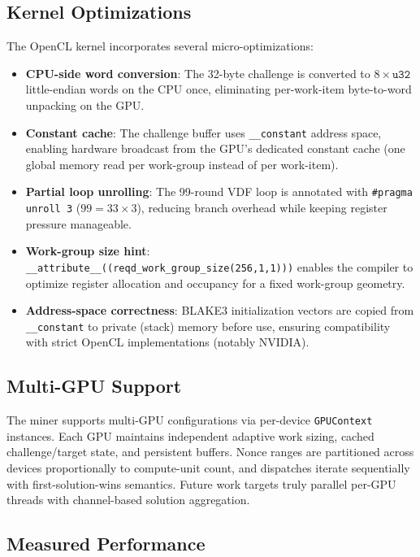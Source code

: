 \documentclass[11pt,a4paper]{article}
\begin{document}
\subsection{Kernel Optimizations}

The OpenCL kernel incorporates several micro-optimizations:

\begin{itemize}
    \item \textbf{CPU-side word conversion}: The 32-byte challenge is converted to $8 \times \mathtt{u32}$ little-endian words on the CPU once, eliminating per-work-item byte-to-word unpacking on the GPU.
    \item \textbf{Constant cache}: The challenge buffer uses \texttt{\_\_constant} address space, enabling hardware broadcast from the GPU's dedicated constant cache (one global memory read per work-group instead of per work-item).
    \item \textbf{Partial loop unrolling}: The 99-round VDF loop is annotated with \texttt{\#pragma unroll 3} ($99 = 33 \times 3$), reducing branch overhead while keeping register pressure manageable.
    \item \textbf{Work-group size hint}: \texttt{\_\_attribute\_\_((reqd\_work\_group\_size(256,1,1)))} enables the compiler to optimize register allocation and occupancy for a fixed work-group geometry.
    \item \textbf{Address-space correctness}: BLAKE3 initialization vectors are copied from \texttt{\_\_constant} to private (stack) memory before use, ensuring compatibility with strict OpenCL implementations (notably NVIDIA).
\end{itemize}

\subsection{Multi-GPU Support}

The miner supports multi-GPU configurations via per-device \texttt{GPUContext} instances. Each GPU maintains independent adaptive work sizing, cached challenge/target state, and persistent buffers. Nonce ranges are partitioned across devices proportionally to compute-unit count, and dispatches iterate sequentially with first-solution-wins semantics. Future work targets truly parallel per-GPU threads with channel-based solution aggregation.

\subsection{Measured Performance}
\end{document}
